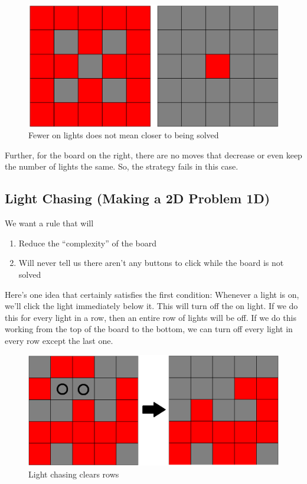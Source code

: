 \documentclass[a4paper]{article}
\begin{document}
	\begin{figure}[H]
		\centering
		\includegraphics[width=\textwidth]{board1.png}
		\caption{Fewer on lights does not mean closer to being solved}
	\end{figure}

	Further, for the board on the right, there are no moves that decrease or even keep the number of lights the same.
	So, the strategy fails in this case.
	
	\subsection{Light Chasing (Making a 2D Problem 1D)}
	We want a rule that will 
	\begin{enumerate}
		\item
			Reduce the ``complexity'' of the board
		\item
			Will never tell us there aren't any buttons to click while the board is not solved
	\end{enumerate}
	Here's one idea that certainly satisfies the first condition: Whenever a light is on, we'll click the light immediately below it.
	This will turn off the on light.
	If we do this for every light in a row, then an entire row of lights will be off.
	If we do this working from the top of the board to the bottom, we can turn off every light in every row except the last one.
	
	\begin{figure}[H]
		\centering
		\includegraphics[width=\textwidth]{board2.png}
		\caption{Light chasing clears rows}
	\end{figure}
\end{document}

